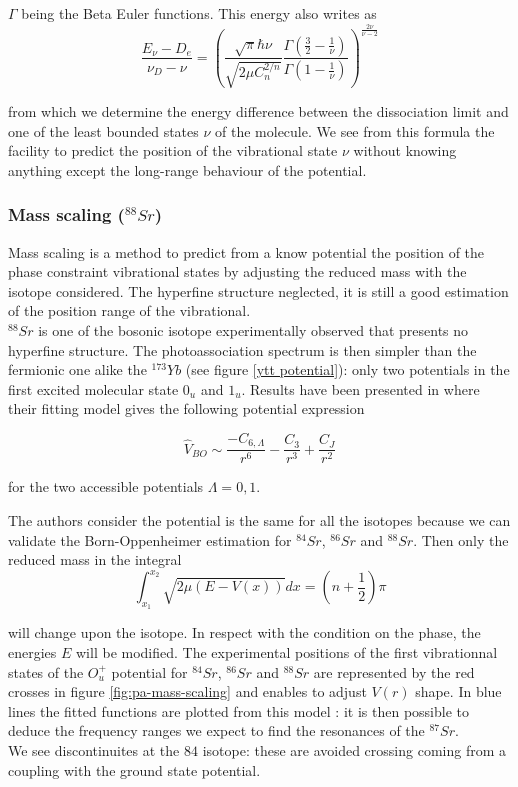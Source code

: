 $\Gamma$ being the Beta Euler functions. This energy also writes as
\begin{equation}
    \frac{E_\nu - D_e}{\nu_D - \nu} = \left(\frac{\sqrt{\pi }\hbar\nu}{\sqrt{2\mu C_n^{2/n}}}\frac{\Gamma(\frac{3}{2} - \frac{1}{\nu})}{\Gamma(1-\frac{1}{\nu})} \right)^\frac{2\nu}{\nu-2}
\end{equation}

from which we determine the energy difference between the dissociation limit and one of the least bounded states $\nu$
of the molecule. We see from this formula the facility to predict the position of the vibrational state $\nu$ without 
knowing anything except the long-range behaviour of the potential. 

\subsubsection{Mass scaling ($^{88}Sr$)}
Mass scaling is a method to predict from a know potential the position of the phase constraint 
vibrational states by adjusting the reduced mass with the isotope considered. The hyperfine structure neglected, it is still a good estimation of the position 
range of the vibrational.\\
$^{88}Sr$ is one of the bosonic isotope experimentally observed that presents no hyperfine 
structure. The photoassociation spectrum is then simpler than the fermionic one alike the 
$^{173}Yb$ (see figure \ref{ytt potential}): only two potentials in the first excited
molecular state $0_u$ and $1_u$. Results have been presented in \cite{zelevinsky_narrow_2006} 
where their fitting model gives the following potential expression

\begin{equation}
    \hat{V}_{BO} \sim \frac{-C_{6,\Lambda}}{r^6} -\frac{C_3}{r^3} + \frac{C_J}{r^2}
\end{equation}

for the two accessible potentials $\Lambda = 0, 1$. 

The authors consider the potential is the
same for all the isotopes because we can validate the Born-Oppenheimer estimation for $^{84}Sr$,
$^{86}Sr$ and $^{88}Sr$.
Then only the reduced mass in the integral
\begin{equation}
    \int_{x_1}^{x_2} \sqrt{2\mu(E-V(x))} dx = (n+\frac{1}{2})\pi 
\end{equation}

will change upon the isotope. In respect with the condition on the phase, the energies $E$ 
will be modified. The experimental positions of the first vibrationnal states of the $O_u^+$ potential for $^{84}Sr$,
$^{86}Sr$ and $^{88}Sr$ are represented by the red crosses in figure \ref{fig:pa-mass-scaling} and enables to adjust
$V(r)$ shape. In blue lines the fitted functions are plotted from this model : it is then possible to deduce the frequency
ranges we expect to find the resonances of the $^{87}Sr$.\\
We see discontinuites at the $84$ isotope: these are avoided crossing coming from a coupling
with the ground state potential.
\\

